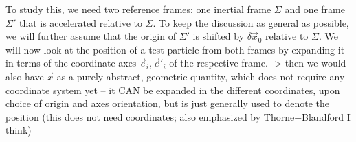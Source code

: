 \documentclass[../class_mech_main.tex]{subfiles}
\begin{document}
To study this, we need two reference frames: one inertial frame $\Sigma$ and one frame $\Sigma'$ that is accelerated relative to $\Sigma$. To keep the discussion as general as possible, we will further assume that the origin of $\Sigma'$ is shifted by $\delta \vec{x}_0$ relative to $\Sigma$. We will now look at the position of a test particle from both frames by expanding it in terms of the coordinate axes $\vec{e}_i, \vec{e}'_i$ of the respective frame.
 -> then we would also have $\vec{x}$ as a purely abstract, geometric quantity, which does not require any coordinate system yet -- it CAN be expanded in the different coordinates, upon choice of origin and axes orientation, but is just generally used to denote the position (this does not need coordinates; also emphasized by Thorne+Blandford I think)
\end{document}
